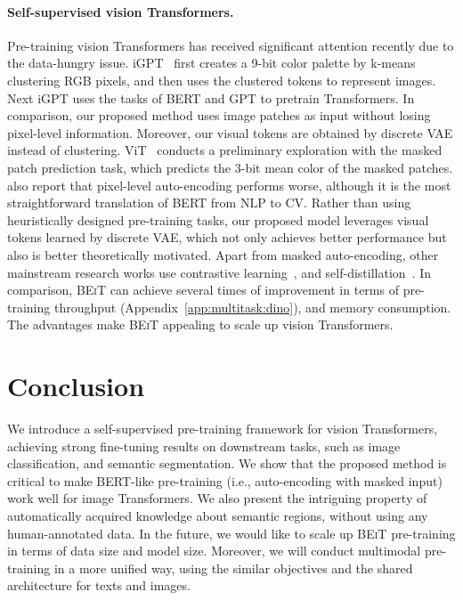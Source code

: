\documentclass{article}
\newcommand\our{\textsc{BEiT}}
\begin{document}
\paragraph{Self-supervised vision Transformers.}
Pre-training vision Transformers has received significant attention recently due to the data-hungry issue.
iGPT~\citep{igpt} first creates a 9-bit color palette by k-means clustering RGB pixels, and then uses the clustered tokens to represent images. Next iGPT uses the tasks of BERT and GPT to pretrain Transformers.
In comparison, our proposed method uses image patches as input without losing pixel-level information. Moreover, our visual tokens are obtained by discrete VAE instead of clustering.
ViT~\citep{vit} conducts a preliminary exploration with the masked patch prediction task, which predicts the 3-bit mean color of the masked patches.
\citep{vit} also report that pixel-level auto-encoding performs worse, although it is the most straightforward translation of BERT from NLP to CV.
Rather than using heuristically designed pre-training tasks, our proposed model leverages visual tokens learned by discrete VAE, which not only achieves better performance but also is better theoretically motivated.
Apart from masked auto-encoding, other mainstream research works use contrastive learning~\citep{mocov3,swin:ssl}, and self-distillation~\citep{dino}.
In comparison, \our{} can achieve several times of improvement in terms of pre-training throughput (Appendix~\ref{app:multitask:dino}), and memory consumption.
The advantages make \our{} appealing to scale up vision Transformers.





\section{Conclusion}

We introduce a self-supervised pre-training framework for vision Transformers, achieving strong fine-tuning results on downstream tasks, such as image classification, and semantic segmentation.
We show that the proposed method is critical to make BERT-like pre-training (i.e., auto-encoding with masked input) work well for image Transformers.
We also present the intriguing property of automatically acquired knowledge about semantic regions, without using any human-annotated data.
In the future, we would like to scale up \our{} pre-training in terms of data size and model size.
Moreover, we will conduct multimodal pre-training in a more unified way, using the similar objectives and the shared architecture for texts and images.
\end{document}
